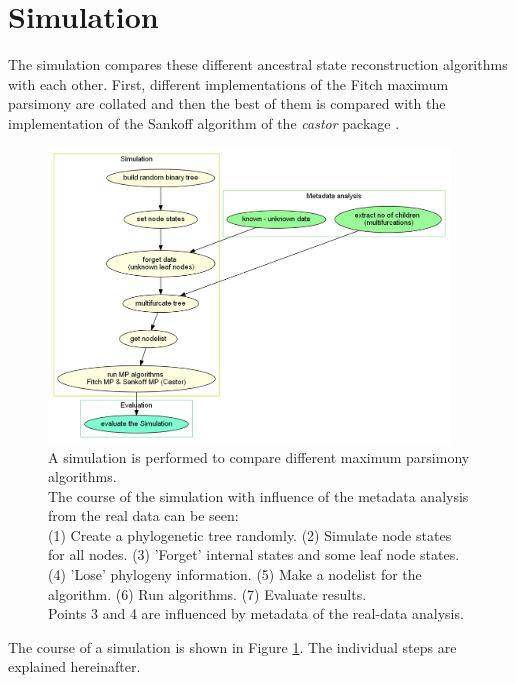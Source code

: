  \section{Simulation}
    The simulation compares these different ancestral state reconstruction algorithms with each 
      other. First, different implementations of the Fitch maximum parsimony are collated and then the 
      best of them is compared with the implementation of the Sankoff algorithm of the \textit{castor} 
      package \cite{Louca2017}.

    \begin{figure}[h!]
      \centering
      \includegraphics[width=0.95\textwidth]{Figures/Workflow-Simulation.png}
      \caption{A simulation is performed to compare different maximum parsimony algorithms. \\
        The course of the simulation with influence of the metadata analysis from the real data can
          be seen: \\
        (1) Create a phylogenetic tree randomly. (2) Simulate node states for all nodes. (3) 
          'Forget' internal states and some leaf node states. (4) 'Lose' phylogeny information. (5) 
          Make a nodelist for the algorithm. (6) Run algorithms. (7) Evaluate results. \\
        Points 3 and 4 are influenced by metadata of the real-data analysis.}
      \label{fig:Simulation Workflow}
    \end{figure}
    The course of a simulation is shown in Figure \ref{fig:Simulation Workflow}. The individual steps 
      are explained hereinafter.

